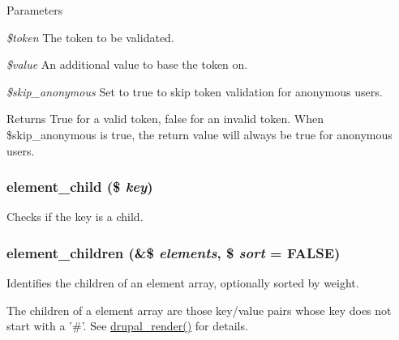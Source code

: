 \begin{DoxyParams}{Parameters}
\item[{\em \$token}]The token to be validated. \item[{\em \$value}]An additional value to base the token on. \item[{\em \$skip\_\-anonymous}]Set to true to skip token validation for anonymous users.\end{DoxyParams}
\begin{DoxyReturn}{Returns}
True for a valid token, false for an invalid token. When \$skip\_\-anonymous is true, the return value will always be true for anonymous users. 
\end{DoxyReturn}
\hypertarget{common_8inc_a3063341f48382cc5ecce25eb1eaa7a0d}{
\subsubsection[{element\_\-child}]{\setlength{\rightskip}{0pt plus 5cm}element\_\-child (\$ {\em key})}}
\label{common_8inc_a3063341f48382cc5ecce25eb1eaa7a0d}
Checks if the key is a child. \hypertarget{common_8inc_ad38ed83e102f4f8c6c47e416543969bc}{
\subsubsection[{element\_\-children}]{\setlength{\rightskip}{0pt plus 5cm}element\_\-children (\&\$ {\em elements}, \/  \$ {\em sort} = {\ttfamily FALSE})}}
\label{common_8inc_ad38ed83e102f4f8c6c47e416543969bc}
Identifies the children of an element array, optionally sorted by weight.

The children of a element array are those key/value pairs whose key does not start with a '\#'. See \hyperlink{common_8inc_a05798b44e8d6c496d4bee5cc32fa7851}{drupal\_\-render()} for details.


